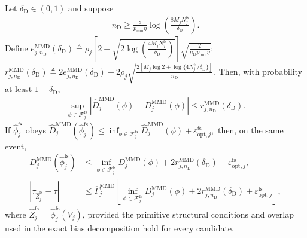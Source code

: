\begin{proposition}
\label{prop:finite-strata-mmd-learning-bound}
Let $\delta_{\mathrm D}\in(0,1)$ and suppose
\begin{align}
n_{\mathrm D}
\ge
\frac{8}{p_{\min}\eta}
\log\left(\frac{8M_jN_j^{\mathrm{fs}}}{\delta_{\mathrm D}}\right).
\label{eq:finite-mmd-sample-threshold}
\end{align}
Define
\(e_{j,n_{\mathrm D}}^{\mathrm{MMD}}(\delta_{\mathrm D}) \triangleq \rho_j \left[ 2+\sqrt{2\log\left(\frac{4M_jN_j^{\mathrm{fs}}}{\delta_{\mathrm D}}\right)} \right] \sqrt{\frac{2}{n_{\mathrm D}p_{\min}\eta}}\); \(r_{j,n_{\mathrm D}}^{\mathrm{MMD}}(\delta_{\mathrm D}) \triangleq 2e_{j,n_{\mathrm D}}^{\mathrm{MMD}}(\delta_{\mathrm D}) +2\rho_j \sqrt{ \frac{ 2\left[M_j\log2+\log\{4N_j^{\mathrm{fs}}/\delta_{\mathrm D}\}\right] }{n_{\mathrm D}} }.\)
Then, with probability at least $1-\delta_{\mathrm D}$,
\begin{align}
\sup_{\phi\in\mathcal F_j^{\mathrm{fs}}}
\left|
\widehat D_j^{\mathrm{MMD}}(\phi)-D_j^{\mathrm{MMD}}(\phi)
\right|
\le
r_{j,n_{\mathrm D}}^{\mathrm{MMD}}(\delta_{\mathrm D}).
\label{eq:finite-mmd-uniform-deviation}
\end{align}
If $\widehat\phi_j^{\mathrm{fs}}$ obeys
\(\widehat D_j^{\mathrm{MMD}}(\widehat\phi_j^{\mathrm{fs}}) \le \inf_{\phi\in\mathcal F_j^{\mathrm{fs}}} \widehat D_j^{\mathrm{MMD}}(\phi) +\varepsilon_{\mathrm{opt},j}^{\mathrm{fs}},\)
then, on the same event,
\begin{align}
D_j^{\mathrm{MMD}}(\widehat\phi_j^{\mathrm{fs}})
&\le
\inf_{\phi\in\mathcal F_j^{\mathrm{fs}}}
D_j^{\mathrm{MMD}}(\phi)
+2r_{j,n_{\mathrm D}}^{\mathrm{MMD}}(\delta_{\mathrm D})
+\varepsilon_{\mathrm{opt},j}^{\mathrm{fs}},
\label{eq:finite-mmd-oracle}\\
|\tau_{\widehat Z_j^{\mathrm{fs}}}-\tau|
&\le
\overline\Gamma_j^{\mathrm{MMD}}
\left[
\inf_{\phi\in\mathcal F_j^{\mathrm{fs}}}
D_j^{\mathrm{MMD}}(\phi)
+2r_{j,n_{\mathrm D}}^{\mathrm{MMD}}(\delta_{\mathrm D})
+\varepsilon_{\mathrm{opt},j}^{\mathrm{fs}}
\right],
\label{eq:finite-mmd-causal-oracle}
\end{align}
where $\widehat Z_j^{\mathrm{fs}}=\widehat\phi_j^{\mathrm{fs}}(V_j)$, provided the primitive structural conditions and overlap used in the exact bias decomposition hold for every candidate.
\end{proposition}

